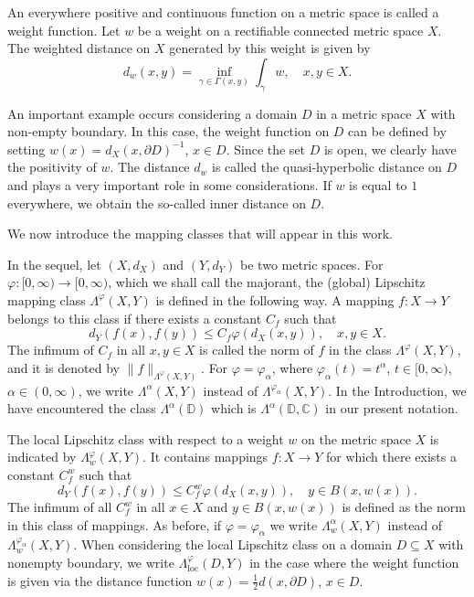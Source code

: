 \documentclass{amsart}
\theoremstyle{definition}
\numberwithin{equation}{section}
\begin{document}
An everywhere positive and continuous function on a metric space is called a weight function. Let $w$ be a weight
on a rectifiable connected metric space $X$. The weighted distance on $X$ generated by this weight is given by
\begin{equation*}
d_w   (x, y)  =  \inf_{\gamma \in \Gamma(x,y)} \int_\gamma w, \quad x,y\in X.
\end{equation*}

An important example occurs considering a domain $D$ in a metric space $X$ with non-empty boundary. In this case, the
weight function on $D$ can be defined by setting $w (x) = d_X(x, \partial D)^{-1}$, $x\in D$. Since the set $D$ is
open, we clearly have the positivity of $w$. The distance $d_w$ is called the quasi-hyperbolic distance on $D$ and
plays a very important role in some considerations. If $w$ is equal to $1$ everywhere, we obtain the so-called inner
distance on $D$.

\medskip


We now introduce the mapping classes that will appear in this work.

In the sequel, let $(X,d_X)$ and $(Y,d_Y)$ be two metric spaces. For $\varphi:[0,\infty)\to [0,\infty)$, which we shall
call the majorant, the (global) Lipschitz mapping class $\Lambda^\varphi(X,Y)$ is defined in the following way. A
mapping $f:X\to Y$ belongs to this class if there exists a constant $C_f$ such that
\begin{equation*}
d_Y (f(x),f(y)) \le  C_f  \varphi (d_X (x,y)),\quad  x,y\in X.
\end{equation*}
The infimum of $C_f$ in all $x,y\in X$ is called the norm of $f$ in the class $\Lambda^\varphi (X,Y)$, and it is denoted
by $\|f\|_{\Lambda^\varphi (X,Y)}$. For $\varphi = \varphi_\alpha$, where $\varphi_\alpha (t) = t^\alpha$,
$t\in [0,\infty)$, $\alpha\in (0, \infty)$, we write $\Lambda ^\alpha (X,Y)$ instead of $\Lambda^{\varphi_\alpha}(X,Y)$.
In the Introduction, we have encountered the class $\Lambda ^\alpha (\mathbb{D})$ which is
$\Lambda ^\alpha (\mathbb{D},\mathbb{C})$ in our present notation.

The local Lipschitz class with respect to a weight $w$ on the metric space $X$ is indicated by
$\Lambda^\varphi_{w} (X,Y)$. It contains mappings $f:X\to Y$ for which there exists a constant $C_{f}^w$ such that
\begin{equation*}
d_ Y (f(x) ,  f(y)) \le C_{f}^w \varphi (  d_X (x,y)), \quad y\in B(x, w(x)).
\end{equation*}
The infimum of all $C_{f}^w$ in all $x\in X$ and $y\in B(x, w(x))$ is defined as the norm in this class of mappings. As
before, if $\varphi = \varphi_\alpha$ we write $\Lambda ^{\alpha}_w(X,Y)$ instead of $\Lambda ^{\varphi_\alpha}_w(X,Y)$.
When considering the local Lipschitz class on a domain $D\subseteq X$ with nonempty boundary, we write
$\Lambda ^\varphi_{\mathrm {loc}} (D, Y)$ in the case where the weight function is given via the distance function
$w(x) =\frac 12 d(x,\partial D)$, $x\in D$.
\end{document}
